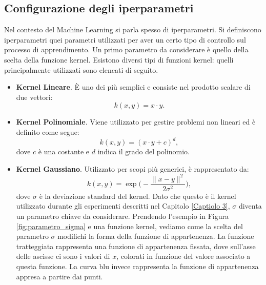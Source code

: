 \documentclass[a4paper,12pt]{report}
\begin{document}
\subsection*{Configurazione degli iperparametri}
Nel contesto del Machine Learning si parla spesso di iperparametri. Si definiscono iperparametri quei parametri utilizzati per aver un certo tipo di controllo sul processo di apprendimento. 
Un primo parametro da considerare è quello della scelta della funzione kernel.
Esistono diversi tipi di funzioni kernel: quelli principalmente utilizzati sono elencati di seguito.

\begin{itemize}
    \item \textbf{Kernel Lineare}. \`E uno dei più semplici e consiste nel prodotto scalare di due vettori:
    \begin{equation*}
        k(x,y) = x \cdot y.
    \end{equation*}

    \item  \textbf{Kernel Polinomiale}. Viene utilizzato per gestire problemi non lineari ed è definito come segue:
    \begin{equation*}
        k(x,y) = (x \cdot y + c)^{d},
    \end{equation*}
    \noindent dove $c$ è  una costante e $d$ indica il grado del polinomio.

    \item \textbf{Kernel Gaussiano}. Utilizzato per scopi più generici, è rappresentato da:
    \begin{equation*}
        k(x,y) = \exp{\bigg(-\frac{\|x-y\|^{2}}{2\sigma^{2}}\bigg)},
    \end{equation*}
    \noindent dove $\sigma$ è la deviazione standard del kernel. Dato che questo è il kernel utilizzato durante gli esperimenti descritti nel Capitolo \ref{Captiolo 3}, $\sigma$ diventa un parametro chiave da considerare. Prendendo l'esempio in Figura \ref{fig:parametro_sigma} e una funzione kernel, vediamo come la scelta del parametro $\sigma$ modifichi la forma della funzione di appartenenza. La funzione tratteggiata rappresenta una funzione di appartenenza fissata, dove sull'asse delle ascisse ci sono i valori di $x$, colorati in funzione del valore associato a questa funzione. La curva blu invece rappresenta la funzione di appartenenza appresa a partire dai punti.


\end{itemize}
\end{document}
